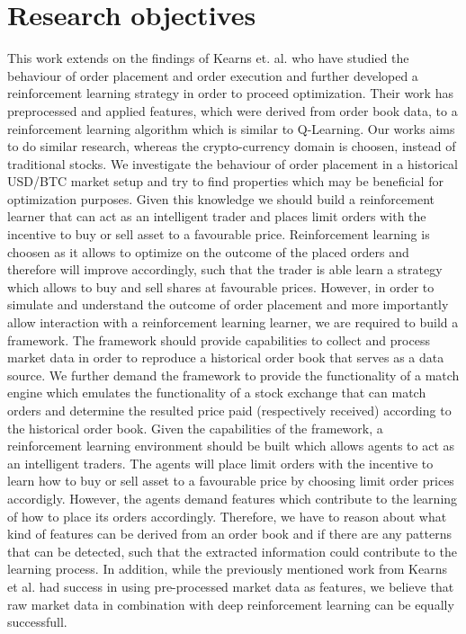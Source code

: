 \section{Research objectives}

This work extends on the findings of Kearns et. al. \cite{nevmyvaka2006reinforcement} who have studied the behaviour of order placement and order execution and further developed a reinforcement learning strategy in order to proceed optimization.
Their work has preprocessed and applied features, which were derived from order book data, to a reinforcement learning algorithm which is similar to Q-Learning.
Our works aims to do similar research, whereas the crypto-currency domain is choosen, instead of traditional stocks.
We investigate the behaviour of order placement in a historical USD/BTC market setup and try to find properties which may be beneficial for optimization purposes.
Given this knowledge we should build a reinforcement learner that can act as an intelligent trader and places limit orders with the incentive to buy or sell asset to a favourable price.
Reinforcement learning is choosen as it allows to optimize on the outcome of the placed orders and therefore will improve accordingly, such that the trader is able learn a strategy which allows to buy and sell shares at favourable prices.
However, in order to simulate and understand the outcome of order placement and more importantly allow interaction with a reinforcement learning learner, we are required to build a framework.
The framework should provide capabilities to collect and process market data in order to reproduce a historical order book that serves as a data source.
We further demand the framework to provide the functionality of a match engine which emulates the functionality of a stock exchange that can match orders and determine the resulted price paid (respectively received) according to the historical order book.
Given the capabilities of the framework, a reinforcement learning environment should be built which allows agents to act as an intelligent traders.
The agents will place limit orders with the incentive to learn how to buy or sell asset to a favourable price by choosing limit order prices accordigly.
However, the agents demand features which contribute to the learning of how to place its orders accordingly.
Therefore, we have to reason about what kind of features can be derived from an order book and if there are any patterns that can be detected, such that the extracted information could contribute to the learning process.
In addition, while the previously mentioned work from Kearns et al. had success in using pre-processed market data as features, we believe that raw market data in combination with deep reinforcement learning can be equally successfull.
